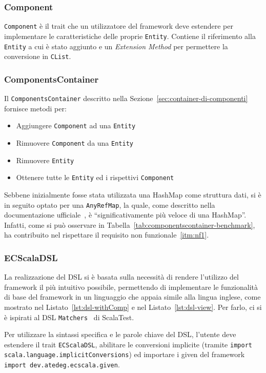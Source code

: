 \subsubsection{Component}\label{subsubsec:component-desc}
\texttt{Component} è il trait che un utilizzatore del framework deve estendere per implementare le caratteristiche delle
proprie \texttt{Entity}.
Contiene il riferimento alla \texttt{Entity} a cui è stato aggiunto e un \textit{Extension Method}\cite{extensionmethods} per permettere la conversione
in \texttt{CList}.

\subsubsection{ComponentsContainer}\label{subsubsec:components-container}
Il \texttt{ComponentsContainer} descritto nella Sezione~\ref{sec:container-di-componenti} fornisce metodi per:
\begin{itemize}
    \item Aggiungere \texttt{Component} ad una \texttt{Entity}
    \item Rimuovere \texttt{Component} da una \texttt{Entity}
    \item Rimuovere \texttt{Entity}
    \item Ottenere tutte le \texttt{Entity} ed i rispettivi \texttt{Component}
\end{itemize}
Sebbene inizialmente fosse stata utilizzata una HashMap come struttura dati, si è in seguito optato
per una \texttt{AnyRefMap}, la quale, come descritto nella documentazione ufficiale~\cite{anyRefMap},
è ``significativamente più veloce di una HashMap''. Infatti, come si può osservare in Tabella~\ref{tab:componentscontainer-benchmark},
ha contribuito nel rispettare il requisito non funzionale~\ref{itm:nf1}.

\subsubsection{ECScalaDSL}\label{subsubsec:dsl-impl}
La realizzazione del DSL si è basata sulla necessità di rendere l'utilizzo del framework il più intuitivo possibile,
permettendo di implementare le funzionalità di base del framework in un linguaggio che appaia simile alla lingua inglese, come mostrato nel
Listato~\ref{lst:dsl-withComp} e nel Listato~\ref{lst:dsl-view}.
Per farlo, ci si è ispirati al DSL \texttt{Matchers}~\cite{matchers} di ScalaTest.

Per utilizzare la sintassi specifica e le parole chiave del DSL, l'utente deve estendere il trait \texttt{ECScalaDSL}, abilitare le conversioni implicite (tramite \texttt{import scala.language.implicitConversions}) ed importare i given del framework\\
\texttt{import dev.atedeg.ecscala.given}.

